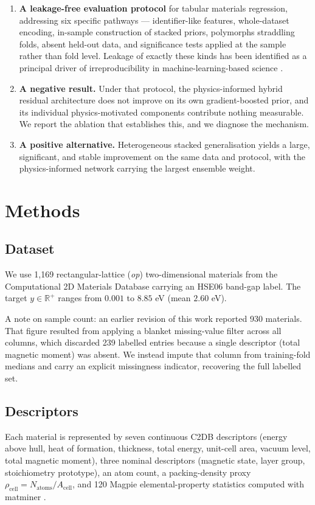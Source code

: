 \documentclass[journal]{IEEEtran}
\begin{document}
\begin{enumerate}
\item \textbf{A leakage-free evaluation protocol} for tabular materials
regression, addressing six specific pathways --- identifier-like features,
whole-dataset encoding, in-sample construction of stacked priors, polymorphs
straddling folds, absent held-out data, and significance tests applied at the
sample rather than fold level. Leakage of exactly these kinds has been
identified as a principal driver of irreproducibility in machine-learning-based
science \cite{kapoor2023leakage}.

\item \textbf{A negative result.} Under that protocol, the physics-informed
hybrid residual architecture does not improve on its own gradient-boosted prior,
and its individual physics-motivated components contribute nothing measurable.
We report the ablation that establishes this, and we diagnose the mechanism.

\item \textbf{A positive alternative.} Heterogeneous stacked generalisation
\cite{wolpert1992stacked, breiman1996stacked} yields a large, significant, and
stable improvement on the same data and protocol, with the physics-informed
network carrying the largest ensemble weight.
\end{enumerate}

\section{Methods}

\subsection{Dataset}
We use 1{,}169 rectangular-lattice (\textit{op}) two-dimensional materials from
the Computational 2D Materials Database \cite{haastrup2018c2db} carrying an
HSE06 band-gap label. The target $y \in \mathbb{R}^+$ ranges from $0.001$ to
$8.85$ eV (mean $2.60$ eV).

A note on sample count: an earlier revision of this work reported 930
materials. That figure resulted from applying a blanket missing-value filter
across all columns, which discarded 239 labelled entries because a single
descriptor (total magnetic moment) was absent. We instead impute that column
from training-fold medians and carry an explicit missingness indicator,
recovering the full labelled set.

\subsection{Descriptors}
Each material is represented by seven continuous C2DB descriptors (energy above
hull, heat of formation, thickness, total energy, unit-cell area, vacuum level,
total magnetic moment), three nominal descriptors (magnetic state, layer group,
stoichiometry prototype), an atom count, a packing-density proxy
$\rho_{\mathrm{cell}} = N_{\mathrm{atoms}} / A_{\mathrm{cell}}$, and 120 Magpie
elemental-property statistics \cite{ward2016magpie} computed with matminer
\cite{ward2018matminer}.
\end{document}
